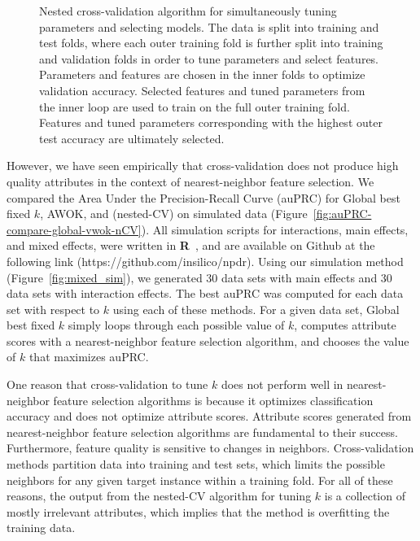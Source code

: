 \documentclass[10pt,letterpaper]{article}
\begin{document}
\begin{figure}[!bht]
	\centering
	\caption{Nested cross-validation algorithm for simultaneously tuning parameters and selecting models. The data is split into training and test folds, where each outer training fold is further split into training and validation folds in order to tune parameters and select features. Parameters and features are chosen in the inner folds to optimize validation accuracy. Selected features and tuned parameters from the inner loop are used to train on the full outer training fold. Features and tuned parameters corresponding with the highest outer test accuracy are ultimately selected.}\label{fig:nCV}
\end{figure}

However, we have seen empirically that cross-validation does not produce high quality attributes in the context of nearest-neighbor feature selection. We compared the Area Under the Precision-Recall Curve (auPRC) for Global best fixed $k$, AWOK, and (nested-CV) on simulated data (Figure~\ref{fig:auPRC-compare-global-vwok-nCV}). All simulation scripts for interactions, main effects, and mixed effects, were written in \textbf{\textsf{R}}~\cite{R}, and are available on Github at the following link (https://github.com/insilico/npdr). Using our simulation method (Figure~\ref{fig:mixed_sim}), we generated 30 data sets with main effects and 30 data sets with interaction effects. The best auPRC was computed for each data set with respect to $k$ using each of these methods. For a given data set, Global best fixed $k$ simply loops through each possible value of $k$, computes attribute scores with a nearest-neighbor feature selection algorithm, and chooses the value of $k$ that maximizes auPRC. 

One reason that cross-validation to tune $k$ does not perform well in nearest-neighbor feature selection algorithms is because it optimizes classification accuracy and does not optimize attribute scores. Attribute scores generated from nearest-neighbor feature selection algorithms are fundamental to their success. Furthermore, feature quality is sensitive to changes in neighbors. Cross-validation methods partition data into training and test sets, which limits the possible neighbors for any given target instance within a training fold. For all of these reasons, the output from the nested-CV algorithm for tuning $k$ is a collection of mostly irrelevant attributes, which implies that the method is overfitting the training data. 
\end{document}
